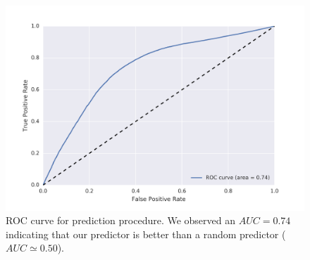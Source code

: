 \begin{figure}[H]
\begin{center}
\includegraphics[width=\columnwidth]{figures/ROC_BETA/ROC_Beta_based_approach_201504.png}
\caption{ROC curve for prediction procedure. We observed an $AUC = 0.74$ indicating that our predictor is better than a random predictor ($AUC \simeq 0.50$).}
\label{ROC_multiclass}
\end{center}
\end{figure}

%
%
%
